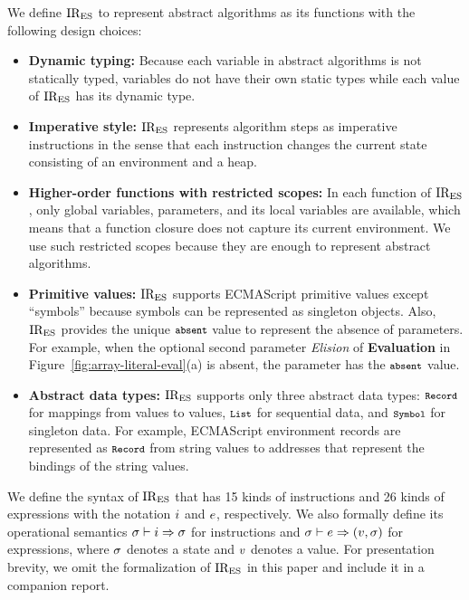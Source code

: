 We define \( \text{IR}_\text{ES} \) to represent abstract algorithms as its
functions with the following design choices:
\begin{itemize}[leftmargin=0.5cm]
\item \textbf{Dynamic typing:} Because each variable in abstract
algorithms is not statically typed, variables do not have their own
static types while each value of \( \text{IR}_\text{ES} \) has its dynamic type.

\item \textbf{Imperative style:} \( \text{IR}_\text{ES} \) represents algorithm steps
as imperative instructions in the sense that each instruction changes
the current state consisting of an environment and a heap.

\item \textbf{Higher-order functions with restricted scopes:}
In each function of \( \text{IR}_\text{ES} \), only global variables, parameters,
and its local variables are available, which means that a function
closure does not capture its current environment.  We use such
restricted scopes because they are enough to represent abstract
algorithms.

\item \textbf{Primitive values:} \( \text{IR}_\text{ES} \) supports ECMAScript primitive
values except ``symbols'' because symbols can be represented as singleton
objects.  Also, \( \text{IR}_\text{ES} \) provides the unique \( \texttt{\footnotesize absent} \) value to
represent the absence of parameters.  For example, when the optional second
parameter \textit{Elision} of \textbf{Evaluation} in
Figure~\ref{fig:array-literal-eval}(a) is absent, the parameter has the \(
\texttt{\footnotesize absent} \) value.

\item \textbf{Abstract data types:} \( \text{IR}_\text{ES} \) supports only three abstract
data types: \( \texttt{\footnotesize Record} \) for mappings from values to values,
\( \texttt{\footnotesize List} \) for sequential data, and \( \texttt{\footnotesize Symbol} \) for singleton
data.  For example, ECMAScript environment records are represented as \(
\texttt{\footnotesize Record} \) from string values to addresses that represent the
bindings of the string values.
\end{itemize}
We define the syntax of \( \text{IR}_\text{ES} \) that has 15 kinds of instructions and 26 kinds
of expressions with the notation \( i \) and \( e \), respectively.
We also formally define its operational semantics \(
\sigma \vdash i \Rightarrow \sigma \) for instructions and
\( \sigma \vdash e \Rightarrow (v, \sigma) \) for expressions,
where \( \sigma \) denotes a state and \( v \) denotes a value.
For presentation brevity, we omit the formalization of \( \text{IR}_\text{ES} \) in this paper
and include it in a companion report.


